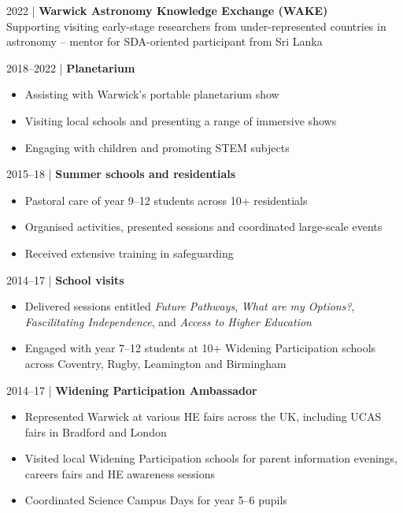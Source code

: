 \documentclass[10pt,a4paper]{altacv}
\begin{document}

\small 2022 | \textbf{Warwick Astronomy Knowledge Exchange (WAKE)} \\
\smallskip
Supporting visiting early-stage researchers from under-represented countries in astronomy -- mentor for SDA-oriented participant from Sri Lanka

\smallskip

\small 2018--2022 | \textbf{Planetarium} \\
\smallskip
\begin{itemize}
	\item Assisting with Warwick's portable planetarium show 
	\item Visiting local schools and presenting a range of immersive shows
	\item Engaging with children and promoting STEM subjects
\end{itemize}

\smallskip

\small 2015--18 | \textbf{Summer schools and residentials} \\
\smallskip
\begin{itemize}
	\item Pastoral care of year 9--12 students across 10+ residentials
	\item Organised activities, presented sessions and coordinated large-scale events
	\item Received extensive training in safeguarding
\end{itemize}

\smallskip

\small 2014--17 | \textbf{School visits} \\
\smallskip
\begin{itemize}
	\item Delivered sessions entitled \textit{Future Pathways}, \textit{What are my Options?}, \textit{Fascilitating Independence}, and \textit{Access to Higher Education} 
	\item Engaged with year 7--12 students at 10+ Widening Participation schools across Coventry, Rugby, Leamington and Birmingham
\end{itemize}

\smallskip

\small 2014--17 | \textbf{Widening Participation Ambassador} \\
\smallskip
\begin{itemize}
	\item Represented Warwick at various HE fairs across the UK, including UCAS fairs in Bradford and London
	\item Visited local Widening Participation schools for parent information evenings, careers fairs and HE awareness sessions
	\item Coordinated Science Campus Days for year 5--6 pupils
\end{itemize}
\end{document}
